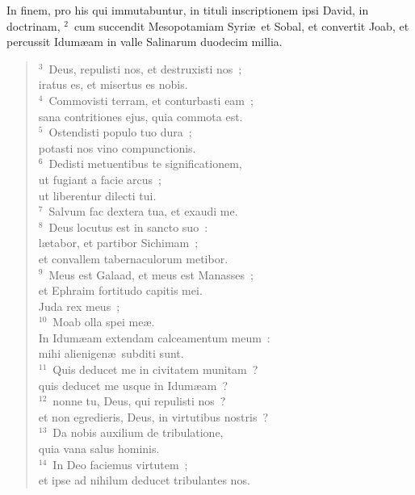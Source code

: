 \bchapter
\lettrine[lines=3,image=true,loversize=0.05,lraise=-0.03]{I}{}n finem, pro his qui immutabuntur, in tituli inscriptionem ipsi David, in doctrinam,
${}^{2}$~cum succendit Mesopotamiam Syri\ae\ et Sobal, et convertit Joab, et percussit Idum\ae am in valle Salinarum duodecim millia.
\begin{flushleft}\begin{verse}${}^{3}$~Deus, repulisti nos, et destruxisti nos~;\\ iratus es, et misertus es nobis.\\
${}^{4}$~Commovisti terram, et conturbasti eam~;\\ sana contritiones ejus, quia commota est.\\
${}^{5}$~Ostendisti populo tuo dura~;\\ potasti nos vino compunctionis.\\
${}^{6}$~Dedisti metuentibus te significationem,\\ ut fugiant a facie arcus~;\\ ut liberentur dilecti tui.\\
${}^{7}$~Salvum fac dextera tua, et exaudi me.\\
${}^{8}$~Deus locutus est in sancto suo~:\\ l\ae tabor, et partibor Sichimam~;\\ et convallem tabernaculorum metibor.\\
${}^{9}$~Meus est Galaad, et meus est Manasses~;\\ et Ephraim fortitudo capitis mei.\\ Juda rex meus~;\\
${}^{10}$~Moab olla spei me\ae .\\ In Idum\ae am extendam calceamentum meum~:\\ mihi alienigen\ae\ subditi sunt.\\
${}^{11}$~Quis deducet me in civitatem munitam~?\\ quis deducet me usque in Idum\ae am~?\\
${}^{12}$~nonne tu, Deus, qui repulisti nos~?\\ et non egredieris, Deus, in virtutibus nostris~?\\
${}^{13}$~Da nobis auxilium de tribulatione,\\ quia vana salus hominis.\\
${}^{14}$~In Deo faciemus virtutem~;\\ et ipse ad nihilum deducet tribulantes nos.\end{verse}\end{flushleft}



